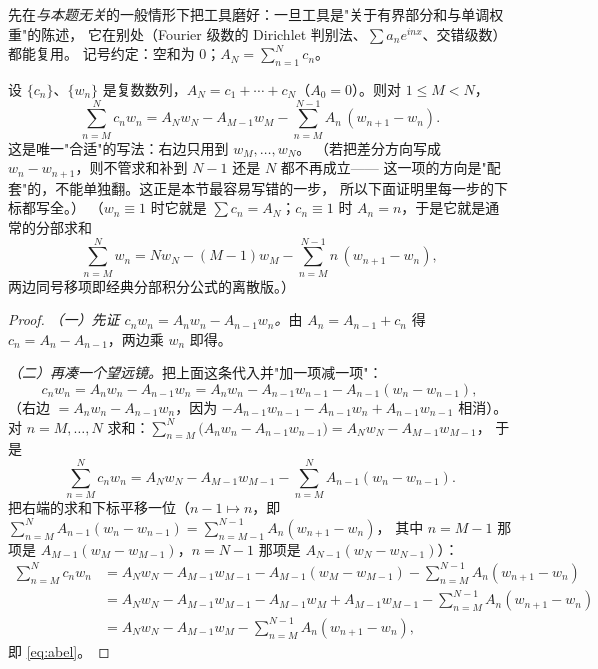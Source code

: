 先在\emph{与本题无关}的一般情形下把工具磨好：一旦工具是"关于有界部分和与单调权重"的陈述，
它在别处（Fourier 级数的 Dirichlet 判别法、$\sum a_ne^{inx}$、交错级数）都能复用。
记号约定：空和为 $0$；$A_N=\sum_{n=1}^{N}c_n$。

\begin{proposition}\label{prop:abel-transform}
设 $\{c_n\}$、$\{w_n\}$ 是复数数列，$A_N=c_1+\cdots+c_N$（$A_0=0$）。则对 $1\le M<N$，
\begin{equation}\label{eq:abel}
\sum_{n=M}^{N}c_nw_n
=A_Nw_N-A_{M-1}w_M-\sum_{n=M}^{N-1}A_n\,(w_{n+1}-w_n).
\end{equation}
这是唯一"合适"的写法：右边只用到 $w_M,\dots,w_N$。
（若把差分方向写成 $w_n-w_{n+1}$，则不管求和补到 $N-1$ 还是 $N$ 都不再成立——
这一项的方向是"配套"的，不能单独翻。这正是本节最容易写错的一步，
所以下面证明里每一步的下标都写全。）
（$w_n\equiv1$ 时它就是 $\sum c_n=A_N$；$c_n\equiv1$ 时 $A_n=n$，于是它就是通常的分部求和
\[
\sum_{n=M}^Nw_n=Nw_N-(M-1)w_M-\sum_{n=M}^{N-1}n\,(w_{n+1}-w_n),
\]
两边同号移项即经典分部积分公式的离散版。）
\end{proposition}

\begin{proof}
\emph{（一）先证 $c_nw_n=A_nw_n-A_{n-1}w_n$。}由 $A_n=A_{n-1}+c_n$ 得
$c_n=A_n-A_{n-1}$，两边乘 $w_n$ 即得。

\emph{（二）再凑一个望远镜。}把上面这条代入并"加一项减一项"：
\[
c_nw_n=A_nw_n-A_{n-1}w_{n}=A_nw_n-A_{n-1}w_{n-1}-A_{n-1}(w_n-w_{n-1}),
\]
（右边 $=A_nw_n-A_{n-1}w_n$，因为 $-A_{n-1}w_{n-1}-A_{n-1}w_n+A_{n-1}w_{n-1}$ 相消）。
对 $n=M,\dots,N$ 求和：$\sum_{n=M}^N\bigl(A_nw_n-A_{n-1}w_{n-1}\bigr)=A_Nw_N-A_{M-1}w_{M-1}$，
于是
\[
\sum_{n=M}^Nc_nw_n=A_Nw_N-A_{M-1}w_{M-1}-\sum_{n=M}^NA_{n-1}(w_n-w_{n-1}).
\]
把右端的求和下标平移一位（$n-1\mapsto n$，即
$\sum_{n=M}^{N}A_{n-1}(w_n-w_{n-1})=\sum_{n=M-1}^{N-1}A_n(w_{n+1}-w_n)$，
其中 $n=M-1$ 那项是 $A_{M-1}(w_M-w_{M-1})$，$n=N-1$ 那项是 $A_{N-1}(w_N-w_{N-1})$）：
\[
\begin{aligned}
\sum_{n=M}^{N}c_nw_n
&=A_Nw_N-A_{M-1}w_{M-1}-A_{M-1}(w_M-w_{M-1})-\sum_{n=M}^{N-1}A_n(w_{n+1}-w_n)\\
&=A_Nw_N-A_{M-1}w_{M-1}-A_{M-1}w_M+A_{M-1}w_{M-1}-\sum_{n=M}^{N-1}A_n(w_{n+1}-w_n)\\
&=A_Nw_N-A_{M-1}w_M-\sum_{n=M}^{N-1}A_n(w_{n+1}-w_n),
\end{aligned}
\]
即 \eqref{eq:abel}。
\end{proof}

